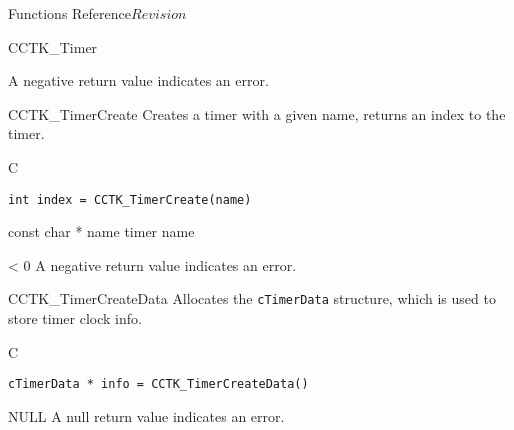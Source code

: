 \begin{cactuspart}{ Functions Reference}{}{$Revision$}
\begin{FunctionDescription}{CCTK\_Timer}
\begin{ErrorSection}
\begin{Error}
A negative return value indicates an error.
\end{Error}
\end{ErrorSection}
\end{FunctionDescription}

\begin{FunctionDescription}{CCTK\_TimerCreate}
\label{CCTK-TimerCreate}
Creates a timer with a given name,
returns an index to the timer.
\begin{SynopsisSection}
\begin{Synopsis}{C}
\begin{verbatim}
int index = CCTK_TimerCreate(name)
\end{verbatim}
\end{Synopsis}
\end{SynopsisSection}

\begin{ParameterSection}
\begin{Parameter} {const char * name}
timer name
\end{Parameter}
\end{ParameterSection}

\begin{ErrorSection}
\begin{Error}{< 0}
A negative return value indicates an error.
\end{Error}
\end{ErrorSection}
\end{FunctionDescription}

\begin{FunctionDescription}{CCTK\_TimerCreateData}
\label{CCTK-TimerCreateData}
Allocates the {\tt cTimerData}
structure, which is used to store timer clock info.

\begin{SynopsisSection}
\begin{Synopsis}{C}
\begin{verbatim}
cTimerData * info = CCTK_TimerCreateData()
\end{verbatim}
\end{Synopsis}
\end{SynopsisSection}

\begin{ErrorSection}
\begin{Error}{NULL}
A null return value indicates an error.
\end{Error}
\end{ErrorSection}
\end{FunctionDescription}



\end{cactuspart}
